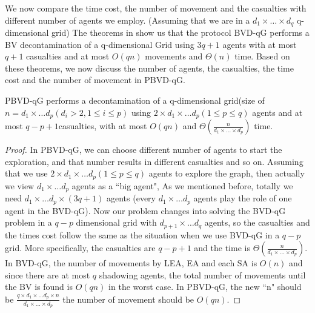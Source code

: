 We now compare the time cost, the number of movement and the casualties with different number of agents we employ. (Assuming that we are in a $d_1\times \ldots \times d_q$ q-dimensional grid)
The theorems in \cite{Cai} show us that the protocol BVD-qG performs a BV decontamination of a q-dimensional Grid using $3q+1$ agents with at most $q+1$ casualties and  at most $O(qn)$ movements and $\Theta(n)$ time. Based on these theorems, we now discuss the number of agents, the casualties, the time cost and the number of movement in PBVD-qG.

 
\begin{theorem}
PBVD-qG performs a decontamination of a q-dimensional grid(size of $n=d_1\times \ldots d_p(d_i>2, 1\leq i\leq p)$ using $2\times d_1\times \ldots d_p (1\leq p\leq q)$ agents and at most $q-p+1$casualties, with at most $O(qn)$ and $\Theta(\frac{n}{d_1\times\ldots\times d_p})$ time.
\end{theorem}

\begin{proof}
In PBVD-qG, we can choose different number of agents to start the exploration, and that number results in different casualties and so on. Assuming that we use $2\times d_1\times \ldots d_p (1\leq p\leq q)$ agents to explore the graph, then actually we view $d_1\times \ldots d_p$ agents as a ``big agent", As we mentioned before, totally we need $d_1\times \ldots d_p\times (3q+1)$ agents (every $d_1\times\ldots d_p$ agents play the role of one agent in the BVD-qG). Now our problem changes into solving the BVD-qG problem in a $q-p$ dimensional grid with $d_{p+1}\times \ldots d_q$ agents, so the casualties and the times cost follow the same as the situation when we use BVD-qG in a $q-p$ grid. More specifically, the casualties are $q-p+1$ and the time is $\Theta(\frac{n}{d_1\times\ldots\times d_p})$. In BVD-qG, the number of movements by LEA, EA and each SA is $O(n)$ and since there are at most $q$ shadowing agents, the total number of movements until the BV is found is $O(qn)$ in the worst case. In PBVD-qG, the new ``n" should be $\frac{q\times d_1\times\ldots d_p\times n}{d_1\times\ldots\times d_p}$ the number of movement should be $O(qn)$.  
\end{proof}

